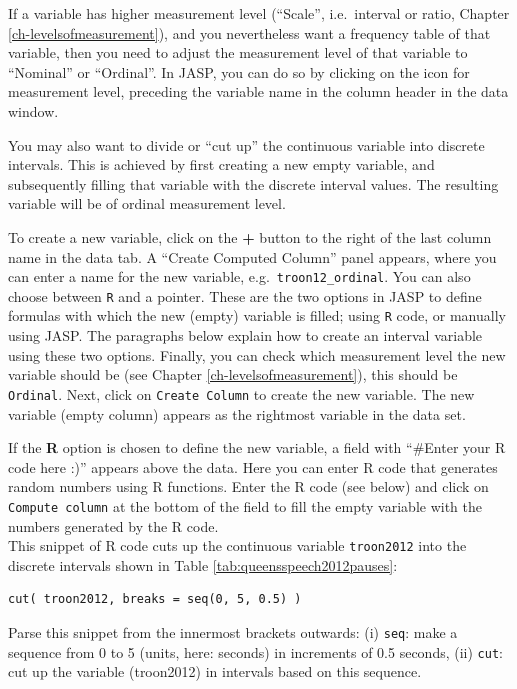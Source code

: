 \documentclass[
]{book}
\begin{document}
If a variable has higher measurement level (``Scale'', i.e.~interval or ratio, Chapter \ref{ch-levelsofmeasurement}), and you nevertheless want a frequency table of that variable, then you need to adjust the measurement level of that variable to ``Nominal'' or ``Ordinal''. In JASP, you can do so by clicking on the icon for measurement level, preceding the variable name in the column header in the data window.

You may also want to divide or ``cut up'' the continuous variable into discrete intervals. This is achieved by first creating a new empty variable, and subsequently filling that variable with the discrete interval values. The resulting variable will be of ordinal measurement level.

To create a new variable, click on the \textbf{+} button to the right of the last column name in the data tab. A ``Create Computed Column'' panel appears, where you can enter a name for the new variable, e.g.~\texttt{troon12\_ordinal}. You can also choose between \texttt{R} and a pointer. These are the two options in JASP to define formulas with which the new (empty) variable is filled; using \texttt{R} code, or manually using JASP. The paragraphs below explain how to create an interval variable using these two options. Finally, you can check which measurement level the new variable should be (see Chapter \ref{ch-levelsofmeasurement}), this should be \texttt{Ordinal}. Next, click on \texttt{Create\ Column} to create the new variable. The new variable (empty column) appears as the rightmost variable in the data set.

If the \textbf{R} option is chosen to define the new variable, a field with ``\#Enter your R code here :)'' appears above the data. Here you can enter R code that generates random numbers using R functions. Enter the R code (see below) and click on \texttt{Compute\ column} at the bottom of the field to fill the empty variable with the numbers generated by the R code.\\
This snippet of R code cuts up the continuous variable \texttt{troon2012} into the discrete intervals shown in Table \ref{tab:queensspeech2012pauses}:

\begin{verbatim}
cut( troon2012, breaks = seq(0, 5, 0.5) ) 
\end{verbatim}

Parse this snippet from the innermost brackets outwards:
(i) \texttt{seq}: make a sequence from 0 to 5 (units, here: seconds) in increments of 0.5 seconds,
(ii) \texttt{cut}: cut up the variable (troon2012) in intervals based on this sequence.
\end{document}
